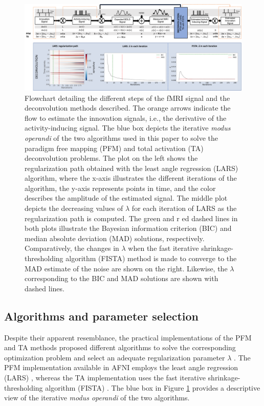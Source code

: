 \begin{figure}[t!]
    \begin{center}
        \includegraphics[width=\columnwidth]{figures/flowchart.pdf}
    \end{center}
    \caption{Flowchart detailing the different steps of the fMRI signal and the
    deconvolution methods described. The orange arrows indicate the flow to
    estimate the innovation signals, i.e., the derivative of
    the activity-inducing signal. The blue box depicts the iterative
    \textit{modus operandi} of the two algorithms used in this paper to solve
    the paradigm free mapping (PFM) and total activation (TA)
    deconvolution problems. The plot on the left shows the regularization path
    obtained with the least angle regression (LARS) algorithm,
    where the x-axis illustrates the different iterations of the algorithm, the
    y-axis represents points in time, and the color describes the amplitude of
    the estimated signal. The middle plot depicts the decreasing values of
    $\lambda$ for each iteration of LARS as the regularization path is computed.
    The green and r ed dashed lines in both plots illustrate the
    Bayesian information criterion (BIC) and
    median absolute deviation (MAD) solutions, respectively.
    Comparatively, the changes in $\lambda$ when the
    fast iterative shrinkage-thresholding algorithm (FISTA)
    method is made to converge to the MAD estimate of the noise are shown on the
    right. Likewise, the $\lambda$ corresponding to the BIC and MAD solutions
    are shown with dashed lines.}
\label{fig:flowchart}
\end{figure}

\subsection{Algorithms and parameter selection}
\label{sec:regparam}
Despite their apparent resemblance, the practical implementations of the PFM and
TA methods proposed different algorithms to solve the corresponding optimization
problem and select an adequate regularization parameter $\lambda$
\citep{Gaudes2013Paradigmfreemapping,Karahanoglu2013TotalactivationfMRI}. The
PFM implementation available in AFNI employs the least angle regression (LARS)
\citep{Efron2004Leastangleregression}, whereas the TA implementation uses the
fast iterative shrinkage-thresholding algorithm (FISTA)
\citep{Beck2009FastIterativeShrinkage}. The blue box in Figure
\ref{fig:flowchart} provides a descriptive view of the iterative \textit{modus
operandi} of the two algorithms.

